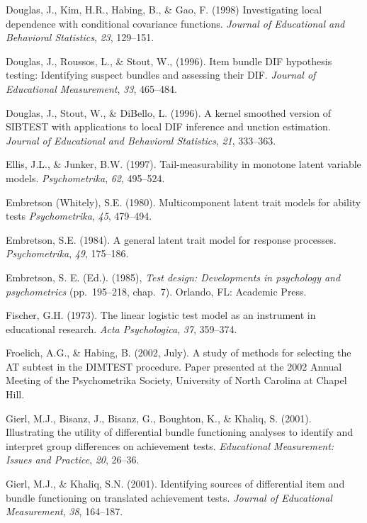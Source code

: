 \documentclass[titlepage,11pt,twoside]{article}
\begin{document}
\begin{thebibliography}
\bibitem Douglas, J., Kim, H.R., Habing, B., \& Gao, F. (1998) Investigating local dependence with conditional covariance functions. \textit{Journal of Educational and Behavioral Statistics}, \textit{23}, 129--151.

\bibitem Douglas, J., Roussos, L., \& Stout, W., (1996). Item bundle DIF hypothesis testing: Identifying suspect bundles and assessing their DIF. \textit{Journal of Educational Measurement}, \textit{33}, 465--484.

\bibitem Douglas, J., Stout, W., \& DiBello, L. (1996). A kernel smoothed version of SIBTEST with applications to local DIF inference and unction estimation. \textit{Journal of Educational and Behavioral Statistics}, \textit{21}, 333--363.

\bibitem Ellis, J.L., \& Junker, B.W. (1997). Tail-measurability in monotone latent variable models. \textit{Psychometrika}, \textit{62}, 495--524.

\bibitem Embretson (Whitely), S.E. (1980). Multicomponent latent trait models for ability tests \textit{Psychometrika}, \textit{45}, 479--494.

\bibitem Embretson, S.E. (1984). A general latent trait model for response processes. \textit{Psychometrika}, \textit{49}, 175--186.

\bibitem Embretson, S. E. (Ed.). (1985), \textit{Test design: Developments in psychology and psychometrics} (pp.~195--218, chap.~7). Orlando, FL: Academic Press.

\bibitem Fischer, G.H. (1973). The linear logistic test model as an instrument in educational research. \textit{Acta Psychologica}, \textit{37}, 359--374.

\bibitem Froelich, A.G., \& Habing, B. (2002, July). A study of methods for selecting the AT subtest in the DIMTEST procedure. Paper presented at the 2002 Annual Meeting of the Psychometrika Society, University of North Carolina at Chapel Hill.

\bibitem Gierl, M.J., Bisanz, J., Bisanz, G., Boughton, K., \& Khaliq, S. (2001). Illustrating the utility of differential bundle functioning analyses to identify and interpret group differences on achievement tests. \textit{Educational Measurement: Issues and Practice}, \textit{20}, 26--36.

\bibitem Gierl, M.J., \& Khaliq, S.N. (2001). Identifying sources of differential item and bundle functioning on translated achievement tests. \textit{Journal of Educational Measurement}, \textit{38}, 164--187.


\end{thebibliography}
\end{document}
